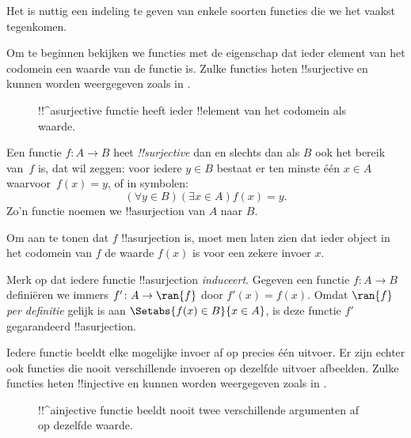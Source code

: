 \documentclass[../../../include/open-logic-section]{subfiles}
\begin{document}

\begin{explain}
Het is nuttig een indeling te geven van enkele soorten functies die we
het vaakst tegenkomen.

Om te beginnen bekijken we functies met de eigenschap dat ieder
element van het codomein een waarde van de functie is. Zulke functies
heten !!{surjective} en kunnen worden weergegeven zoals in
.

\begin{figure}
  \caption{!!^a{surjective} functie heeft ieder !!{element} van het
    codomein als waarde.}
\end{figure}
\end{explain}

\begin{defn}
Een functie $f \colon A \rightarrow B$ heet \emph{!!{surjective}} dan
en slechts dan als $B$ ook het bereik van~$f$ is, dat wil zeggen: voor
iedere $y \in B$ bestaat er ten minste één $x \in A$ waarvoor~$f(x) =
y$, of in symbolen:
\[
  (\forall y \in B)(\exists x \in A)f(x) = y.
\]
Zo'n functie noemen we !!a{surjection} van $A$ naar $B$.
\end{defn}

\begin{explain}
Om aan te tonen dat $f$ !!a{surjection} is, moet men laten zien dat
ieder object in het codomein van $f$ de waarde $f(x)$ is voor een
zekere invoer $x$.

Merk op dat iedere functie !!a{surjection} \emph{induceert}. Gegeven
een functie $f \colon A \to B$ definiëren we immers $f' \colon A \to
\ran{f}$ door $f'(x) = f(x)$. Omdat $\ran{f}$ \emph{per definitie}
gelijk is aan $\Setabs{f(x) \in B}{x \in A}$, is deze functie $f'$
gegarandeerd !!a{surjection}.
\end{explain}

\begin{explain}
Iedere functie beeldt elke mogelijke invoer af op precies één uitvoer.
Er zijn echter ook functies die nooit verschillende invoeren op
dezelfde uitvoer afbeelden. Zulke functies heten !!{injective} en
kunnen worden weergegeven zoals in .
\begin{figure}
  \caption{!!^a{injective} functie beeldt nooit twee verschillende
    argumenten af op dezelfde waarde.}
\end{figure}
\end{explain}
\end{document}
